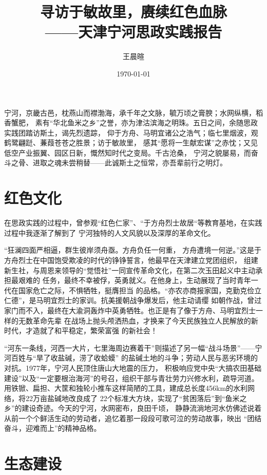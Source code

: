 \documentclass[11pt,a4paper]{ctexart}
\title{寻访于敏故里，赓续红色血脉\\——天津宁河思政实践报告}
\author{王晨暄}
\date{\today}
\begin{document}
\maketitle

宁河，京畿古邑，枕燕山而襟渤海，承千年之文脉，毓万顷之膏腴；水网纵横，稻香蟹肥，
素有“华北鱼米之乡”之誉，亦为津沽滨海之明珠。五日之间，余随思政实践团踏访斯土，谒先烈遗踪，
仰于方舟、马明宜诸公之浩气；临七里烟波，观鹤鹭翩跹、蒹葭苍苍之胜景；访于敏故里，
感其“愿将一生献宏谋”之赤忱；又见低空产业振翼、园区日新，慨然知时代之变局。千古沧桑，
宁河之貌屡易，而奋斗之骨、进取之魂未尝稍替——此诚斯土之恒常，亦吾辈前行之明灯。

\section{红色文化}

在思政实践的过程中，曾参观“红色仁家”、“于方舟烈士故居“等教育基地，在实践过程中我逐渐了解到了
宁河独特的人文风貌以及深厚的革命文化。

“狂澜四面严相逼，群生彼岸须舟亟。方舟负任一何重，
方舟遭境一何逆。”这是于方舟烈士在中国饱受欺凌的时代的铮铮誓言，他最早在天津建立党团组织，
组建新生社，与周恩来领导的“觉悟社”一同宣传革命文化，在第二次玉田起义中主动承担最艰难的
任务，最终不幸被俘，英勇就义。在他身上，生动展现了当时青年一代在国家危亡之际，不惧牺牲，挺膺担当
的品格。“亦农亦商报家国，克勤克俭立仁德”，是马明宜烈士的家训。抗美援朝战争爆发后，他主动请缨
如朝作战，曾过家门而不入，最终在大渝洞轰炸中英勇牺牲。也正是有了像于方舟、马明宜烈士一样的无数革命先辈
在战场上抛头颅洒热血，才换来了今天民族独立人民解放的新时代，才造就了和平稳定，繁荣富强
的新社会！

“河东一条线，河西一大片，七里海周边赛着干”则描述了另一幅“战斗场景”——宁河百姓与“旱了收盐碱，涝了收蛤蟆”
的盐碱土地的斗争；劳动人民与恶劣环境的对抗。1977年，宁河人民顶住唐山大地震的压力，
积极响应党中央“大搞农田基础建设”以及“一定要根治海河”的号召，组织干部与青壮劳力兴修水利，疏导河道。
用铁锨、扁担、大筐和独轮小推车这样简陋的工具，建成总长度456km的水利网络，将22万亩盐碱地改良成了
22个标准大方块，实现了“贫困落后”到“鱼米之乡”的建设奇迹。今天的宁河，水网密布，良田千顷，
静静流淌地河水仿佛述说着从前一个个鲜活生动的劳动者，追忆着那一段段可歌可泣的劳动故事，映出
“团结奋斗，迎难而上”的精神品格。

\section{生态建设}
\end{document}

